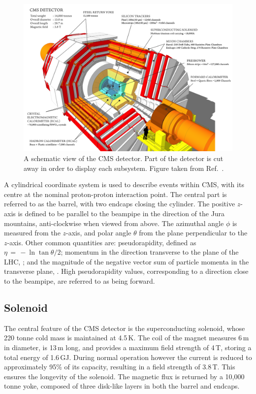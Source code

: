 \begin{figure}[h!]
  \centering
  \includegraphics[width=\textwidth]{Figures/Detector/CMSschematic.png}
  \caption[A schematic view of the CMS detector.]
  {A schematic view of the CMS detector.
  Part of the detector is cut away in order to display each subsystem.
  Figure taken from Ref.~\cite{SketchUp}.}
  \label{fig:detector_CMSschematic}
\end{figure}

A cylindrical coordinate system is used to describe events within CMS, with its centre at the nominal proton-proton interaction point.
The central part is referred to as the barrel, with two endcaps closing the cylinder.
The positive $z$-axis is defined to be parallel to the beampipe in the direction of the Jura mountains, anti-clockwise when viewed from above.
The azimuthal angle $\phi$ is measured from the $z$-axis, and polar angle $\theta$ from the plane perpendicular to the $z$-axis.
Other common quantities are: pseudorapidity, defined as $\eta \, = \, -\ln{\tan{\theta/2}}$; 
momentum in the direction transverse to the plane of the LHC, \pt; 
and the magnitude of the negative vector sum of particle momenta in the transverse plane, \met.
High pseudorapidity values, corresponding to a direction close to the beampipe, are referred to as being forward.

\subsection{Solenoid}

The central feature of the CMS detector is the superconducting solenoid, whose 220 tonne cold mass is maintained at 4.5\,K.%
The coil of the magnet measures 6\,m in diameter, is 13\,m long, and provides a maximum field strength of 4\,T, storing a total energy of 1.6\,GJ.
During normal operation however the current is reduced to approximately 95\% of its capacity, resulting in a field strength of 3.8\,T.
This ensures the longevity of the solenoid.
The magnetic flux is returned by a 10,000 tonne yoke, composed of three disk-like layers in both the barrel and endcaps.

